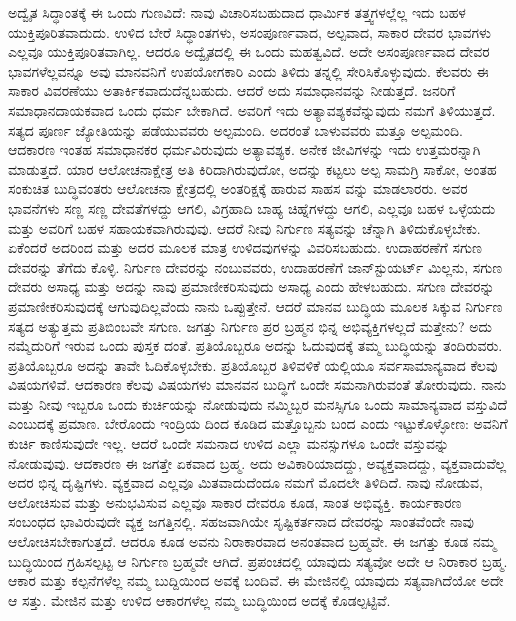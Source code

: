 ಅದ್ವೈತ ಸಿದ್ಧಾಂತಕ್ಕೆ ಈ ಒಂದು ಗುಣವಿದೆ: ನಾವು ವಿಚಾರಿಸಬಹುದಾದ ಧಾರ್ಮಿಕ ತತ್ತ್ವಗಳಲ್ಲೆಲ್ಲ ಇದು ಬಹಳ ಯುಕ್ತಿಪೂರಿತವಾದುದು. ಉಳಿದ ಬೇರೆ ಸಿದ್ಧಾಂತಗಳು, ಅಸಂಪೂರ್ಣವಾದ, ಅಲ್ಪವಾದ, ಸಾಕಾರ ದೇವರ ಭಾವಗಳು ಎಲ್ಲವೂ ಯುಕ್ತಿಪೂರಿತವಾಗಿಲ್ಲ. ಆದರೂ ಅದ್ವೈತದಲ್ಲಿ ಈ ಒಂದು ಮಹತ್ವವಿದೆ. ಅದೇ ಅಸಂಪೂರ್ಣವಾದ ದೇವರ ಭಾವಗಳೆಲ್ಲವನ್ನೂ ಅವು ಮಾನವನಿಗೆ ಉಪಯೋಗಕಾರಿ ಎಂದು ತಿಳಿದು ತನ್ನಲ್ಲಿ ಸೇರಿಸಿಕೊಳ್ಳುವುದು. ಕೆಲವರು ಈ ಸಾಕಾರ ವಿವರಣೆಯು ಅತಾರ್ಕಿಕವಾದುದೆನ್ನಬಹುದು. ಆದರೆ ಅದು ಸಮಾಧಾನವನ್ನು ನೀಡುತ್ತದೆ. ಜನರಿಗೆ ಸಮಾಧಾನದಾಯಕವಾದ ಒಂದು ಧರ್ಮ ಬೇಕಾಗಿದೆ. ಅವರಿಗೆ ಇದು ಅತ್ಯಾವಶ್ಯಕವೆನ್ನುವುದು ನಮಗೆ ತಿಳಿಯುತ್ತದೆ. ಸತ್ಯದ ಪೂರ್ಣ ಜ್ಯೋತಿಯನ್ನು ಪಡೆಯುವವರು ಅಲ್ಪಮಂದಿ. ಅದರಂತೆ ಬಾಳುವವರು ಮತ್ತೂ ಅಲ್ಪಮಂದಿ. ಆದಕಾರಣ ಇಂತಹ ಸಮಾಧಾನಕರ ಧರ್ಮವಿರುವುದು ಅತ್ಯಾವಶ್ಯಕ. ಅನೇಕ ಜೀವಿಗಳನ್ನು ಇದು ಉತ್ತಮರನ್ನಾಗಿ ಮಾಡುತ್ತದೆ. ಯಾರ ಆಲೋಚನಾಕ್ಷೇತ್ರ ಅತಿ ಕಿರಿದಾಗಿರುವುದೋ, ಅದನ್ನು ಕಟ್ಟಲು ಅಲ್ಪ ಸಾಮಗ್ರಿ ಸಾಕೋ, ಅಂತಹ ಸಂಕುಚಿತ ಬುದ್ಧಿವಂತರು ಆಲೋಚನಾ ಕ್ಷೇತ್ರದಲ್ಲಿ ಅಂತರಿಕ್ಷಕ್ಕೆ ಹಾರುವ ಸಾಹಸ ವನ್ನು ಮಾಡಲಾರರು. ಅವರ ಭಾವನೆಗಳು ಸಣ್ಣ ಸಣ್ಣ ದೇವತೆಗಳದ್ದು ಆಗಲಿ, ವಿಗ್ರಹಾದಿ ಬಾಹ್ಯ ಚಿಹ್ನೆಗಳದ್ದು ಆಗಲಿ, ಎಲ್ಲವೂ ಬಹಳ ಒಳ್ಳೆಯದು ಮತ್ತು ಅವರಿಗೆ ಬಹಳ ಸಹಾಯಕವಾಗಿರುವುವು. ಆದರೆ ನೀವು ನಿರ್ಗುಣ ಸತ್ಯವನ್ನು ಚೆನ್ನಾಗಿ ತಿಳಿದುಕೊಳ್ಳಬೇಕು. ಏಕೆಂದರೆ ಅದರಿಂದ ಮತ್ತು ಅದರ ಮೂಲಕ ಮಾತ್ರ ಉಳಿದವುಗಳನ್ನು ವಿವರಿಸಬಹುದು. ಉದಾಹರಣೆಗೆ ಸಗುಣ ದೇವರನ್ನು ತೆಗೆದು ಕೊಳ್ಳಿ. ನಿರ್ಗುಣ ದೇವರನ್ನು ನಂಬುವವರು, ಉದಾಹರಣೆಗೆ ಜಾನ್​ ಸ್ಟುಯರ್ಟ್​ ಮಿಲ್ಲನು, ಸಗುಣ ದೇವರು ಅಸಾಧ್ಯ ಮತ್ತು ಅದನ್ನು ನಾವು ಪ್ರಮಾಣೀಕರಿಸುವುದು ಅಸಾಧ್ಯ ಎಂದು ಹೇಳಬಹುದು. ಸಗುಣ ದೇವರನ್ನು ಪ್ರಮಾಣೀಕರಿಸುವುದಕ್ಕೆ ಆಗುವುದಿಲ್ಲವೆಂದು ನಾನು ಒಪ್ಪುತ್ತೇನೆ. ಆದರೆ ಮಾನವ ಬುದ್ಧಿಯ ಮೂಲಕ ಸಿಕ್ಕುವ ನಿರ್ಗುಣ ಸತ್ಯದ ಅತ್ಯುತ್ತಮ ಪ್ರತಿಬಿಂಬವೇ ಸಗುಣ. ಜಗತ್ತು ನಿರ್ಗುಣ ಪ್ರರ ಬ್ರಹ್ಮನ ಭಿನ್ನ ಅಭಿವ್ಯಕ್ತಿಗಳಲ್ಲದೆ ಮತ್ತೇನು? ಅದು ನಮ್ಮೆದುರಿಗೆ ಇರುವ ಒಂದು ಪುಸ್ತಕ ದಂತೆ. ಪ್ರತಿಯೊಬ್ಬರೂ ಅದನ್ನು ಓದುವುದಕ್ಕೆ ತಮ್ಮ ಬುದ್ಧಿಯನ್ನು ತಂದಿರುವರು. ಪ್ರತಿಯೊಬ್ಬರೂ ಅದನ್ನು ತಾವೇ ಓದಿಕೊಳ್ಳಬೇಕು. ಪ್ರತಿಯೊಬ್ಬರ ತಿಳಿವಳಿಕೆ ಯಲ್ಲಿಯೂ ಸರ್ವಸಾಮಾನ್ಯವಾದ ಕೆಲವು ವಿಷಯಗಳಿವೆ. ಆದಕಾರಣ ಕೆಲವು ವಿಷಯಗಳು ಮಾನವನ ಬುದ್ಧಿಗೆ ಒಂದೇ ಸಮನಾಗಿರುವಂತೆ ತೋರುವುದು. ನಾನು ಮತ್ತು ನೀವು ಇಬ್ಬರೂ ಒಂದು ಕುರ್ಚಿಯನ್ನು ನೋಡುವುದು ನಮ್ಮಿಬ್ಬರ ಮನಸ್ಸಿಗೂ ಒಂದು ಸಾಮಾನ್ಯವಾದ ವಸ್ತುವಿದೆ ಎಂಬುದಕ್ಕೆ ಪ್ರಮಾಣ. ಬೇರೊಂದು ಇಂದ್ರಿಯ ದಿಂದ ಕೂಡಿದ ಮತ್ತೊಬ್ಬನು ಬಂದ ಎಂದು ಇಟ್ಟುಕೊಳ್ಳೋಣ: ಅವನಿಗೆ ಕುರ್ಚಿ ಕಾಣಿಸುವುದೇ ಇಲ್ಲ. ಆದರೆ ಒಂದೇ ಸಮನಾದ ಉಳಿದ ಎಲ್ಲಾ ಮನಸ್ಸುಗಳೂ ಒಂದೇ ವಸ್ತುವನ್ನು ನೋಡುವುವು. ಆದಕಾರಣ ಈ ಜಗತ್ತೇ ಏಕವಾದ ಬ್ರಹ್ಮ. ಅದು ಅವಿಕಾರಿಯಾದದ್ದು, ಅವ್ಯಕ್ತವಾದದ್ದು, ವ್ಯಕ್ತವಾದುವೆಲ್ಲ ಅದರ ಭಿನ್ನ ದೃಷ್ಟಿಗಳು. ವ್ಯಕ್ತವಾದ ಎಲ್ಲವೂ ಮಿತವಾದುದೆಂದೂ ನಮಗೆ ಮೊದಲೇ ತಿಳಿದಿದೆ. ನಾವು ನೋಡುವ, ಆಲೋಚಿಸುವ ಮತ್ತು ಅನುಭವಿಸುವ ಎಲ್ಲವೂ ಸಾಕಾರ ದೇವರೂ ಕೂಡ, ಸಾಂತ ಅಭಿವ್ಯಕ್ತಿ. ಕಾರ್ಯಕಾರಣ ಸಂಬಂಧದ ಭಾವಿರುವುದೇ ವ್ಯಕ್ತ ಜಗತ್ತಿನಲ್ಲಿ. ಸಹಜವಾಗಿಯೇ ಸೃಷ್ಟಿಕರ್ತನಾದ ದೇವರನ್ನು ಸಾಂತವೆಂದೇ ನಾವು ಆಲೋಚಿಸಬೇಕಾಗುತ್ತದೆ. ಆದರೂ ಕೂಡ ಅವನು ನಿರಾಕಾರವಾದ ಅನಂತವಾದ ಬ್ರಹ್ಮವೇ. ಈ ಜಗತ್ತು ಕೂಡ ನಮ್ಮ ಬುದ್ಧಿಯಿಂದ ಗ್ರಹಿಸಲ್ಪಟ್ಟ ಆ ನಿರ್ಗುಣ ಬ್ರಹ್ಮವೇ ಆಗಿದೆ. ಪ್ರಪಂಚದಲ್ಲಿ ಯಾವುದು ಸತ್ಯವೋ ಅದೇ ಆ ನಿರಾಕಾರ ಬ್ರಹ್ಮ. ಆಕಾರ ಮತ್ತು ಕಲ್ಪನೆಗಳೆಲ್ಲ ನಮ್ಮ ಬುದ್ದಿಯಿಂದ ಅವಕ್ಕೆ ಬಂದಿವೆ. ಈ ಮೇಜಿನಲ್ಲಿ ಯಾವುದು ಸತ್ಯವಾಗಿದೆಯೋ ಅದೇ ಆ ಸತ್ತು. ಮೇಜಿನ ಮತ್ತು ಉಳಿದ ಆಕಾರಗಳೆಲ್ಲ ನಮ್ಮ ಬುದ್ಧಿಯಿಂದ ಅದಕ್ಕೆ ಕೊಡಲ್ಪಟ್ಟಿವೆ.


